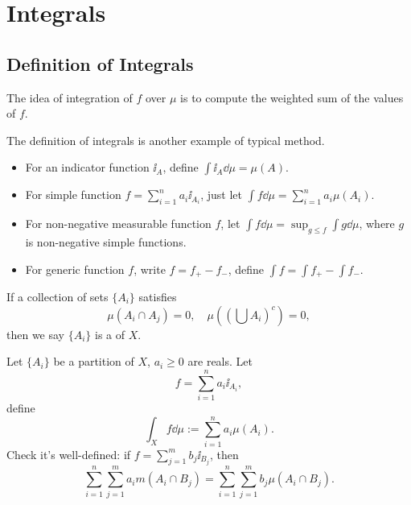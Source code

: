 \section{Integrals}
\label{sec:Integrals}

\subsection{Definition of Integrals}
\label{sub:Definition of Integrals}

The idea of integration of $f$ over $\mu$ is to
compute the weighted sum of the values of $f$.

The definition of integrals is another example of typical method.

\begin{itemize}
	\item For an indicator function $\ii_A$,
		define $\int \ii_A \dd \mu = \mu(A)$.
	\item For simple function $f = \sum_{i=1}^{n} a_i\ii_{A_i}$,
		just let $\int f\dd \mu = \sum_{i=1}^{n} a_i\mu(A_i)$.

	\item For non-negative measurable function $f$,
		let $\int f\dd \mu = \sup_{g\le f} \int g\dd \mu$, where
		$g$ is non-negative simple functions.
	\item For generic function $f$, write $f = f_+ - f_-$,
		define $\int f = \int f_+ - \int f_-$.
\end{itemize}

\begin{definition}
	If a collection of sets $\{A_i\}$ satisfies
	\[
	\mu(A_i\cap A_j) = 0,\quad \mu((\bigcup A_i)^c) = 0,
	\]
	then we say $\{A_i\}$ is a  of $X$.
\end{definition}
\begin{definition}
	Let $\{A_i\}$ be a partition of $X$, $a_i\ge 0$ are reals.
	Let
	\[
	f = \sum_{i=1}^{n} a_i \ii_{A_i},
	\]
	define
	\[
	\int_X f\dd \mu := \sum_{i=1}^{n} a_i \mu(A_i).
	\]
	Check it's well-defined:
	if $f = \sum_{j=1}^{m} b_j\ii_{B_j}$, then
	\[
	\sum_{i=1}^{n} \sum_{j=1}^{m} a_im(A_i\cap B_j) =
	\sum_{i=1}^{n} \sum_{j=1}^{m} b_j \mu(A_i\cap B_j).
	\]
\end{definition}


